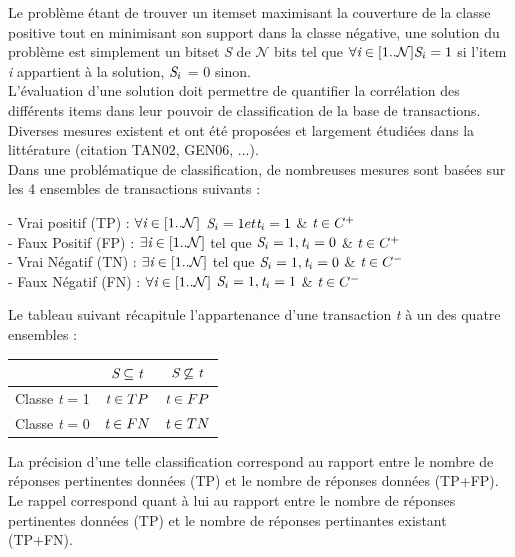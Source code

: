 \documentclass[a4paper,10pt]{report}
\begin{document}
	Le problème étant de trouver un itemset maximisant la couverture de la classe positive tout en minimisant son support dans la classe négative, une solution du problème est simplement un bitset \emph{S} de $\mathcal{N}$ bits tel que $\forall \emph{i} \in [1..\mathcal{N}] \emph{S}_{i} = 1$ si l'item \emph{i} appartient à la solution, $\emph{S}_{i}$ = 0 sinon. \\
	L'évaluation d'une solution doit permettre de quantifier la corrélation des différents items dans leur pouvoir de classification de la base de transactions. Diverses mesures existent et ont été proposées et largement étudiées dans la littérature (citation TAN02, GEN06, ...).\\
	Dans une problématique de classification, de nombreuses mesures sont basées sur les 4 ensembles de transactions suivants :
\begin{center}
	- Vrai positif (TP) : $\forall \emph{i} \in [1..\mathcal{N}]$  $\emph{S}_{i} = 1 et \emph{t}_{i} = 1$ \&  $\emph{t} \in C^{+}$ \\
	- Faux Positif (FP) : $\exists \emph{i} \in [1..\mathcal{N}]$ tel que $\emph{S}_{i} = 1, \emph{t}_{i} = 0$ \&  $\emph{t} \in C^{+}$\\
	- Vrai Négatif (TN) : $\exists \emph{i} \in [1..\mathcal{N}]$ tel que $\emph{S}_{i} = 1, \emph{t}_{i} = 0$ \&  $\emph{t} \in C^{-}$\\
	- Faux Négatif (FN) : $\forall \emph{i} \in [1..\mathcal{N}]$ $\emph{S}_{i} = 1, \emph{t}_{i} = 1$ \&  $\emph{t} \in C^{-}$\\
\end{center}

 Le tableau suivant récapitule l'appartenance d'une transaction \emph{t} à un des quatre ensembles : 
	 
\begin{center}
	\begin{tabular}{|c|c|c|}
		\hline
		& $\emph{S} \subseteq \emph{t}$ & $\emph{S} \not\subseteq \emph{t}$ \\
		\hline
		Classe \emph{t} = 1 & $\emph{t} \in TP$ & $\emph{t} \in FP$ \\
		\hline
		Classe \emph{t} = 0 & $\emph{t} \in FN$ & $\emph{t} \in TN$ \\
		\hline
\end{tabular}
\end{center}

La précision d'une telle classification correspond au rapport entre le nombre de réponses pertinentes données (TP) et le nombre de réponses données (TP+FP). Le rappel correspond quant à lui au rapport entre le nombre de réponses pertinentes données (TP) et le nombre de réponses pertinantes existant (TP+FN). 
\end{document}
